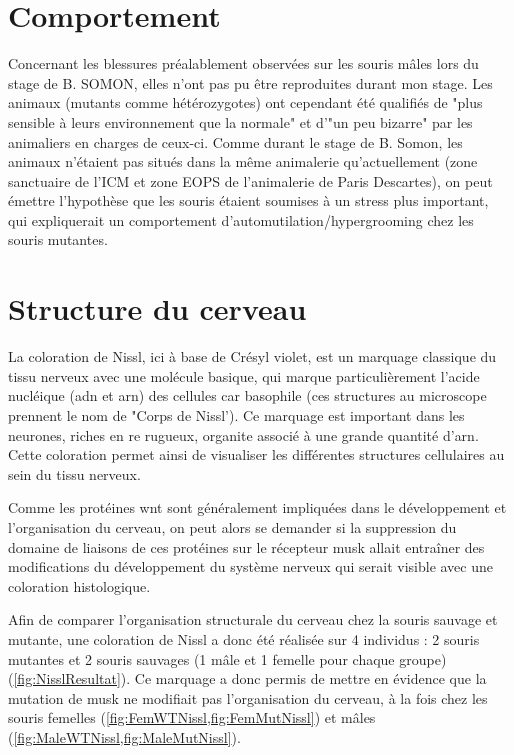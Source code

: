 \section{Comportement}
\label{sec:Comportement}
	Concernant les blessures préalablement observées sur les souris \mcrd mâles lors du stage de B. SOMON, elles n'ont pas pu être reproduites durant mon stage. Les animaux (mutants comme hétérozygotes) ont cependant été qualifiés de "plus sensible à leurs environnement que la normale" et d'"un peu bizarre" par les animaliers en charges de ceux-ci. Comme durant le stage de B. Somon, les animaux n'étaient pas situés dans la même animalerie qu'actuellement (zone sanctuaire de l'ICM et zone EOPS de l'animalerie de Paris Descartes), on peut émettre l'hypothèse que les souris étaient soumises à un stress plus important, qui expliquerait un comportement d'automutilation/hypergrooming chez les souris mutantes. 

\section{Structure du cerveau}
\label{sec:NisslResultat}
	La coloration de Nissl, ici à base de Crésyl violet, est un marquage classique du tissu nerveux avec une molécule basique, qui marque particulièrement l'acide nucléique (\acrshort{adn} et \acrshort{arn}) des cellules car basophile (ces structures au microscope prennent le nom de "Corps de Nissl'). Ce marquage est important dans les neurones, riches en \gls{re} rugueux, organite associé à une grande quantité d'\acrshort{arn}. Cette coloration permet ainsi de visualiser les différentes structures cellulaires au sein du tissu nerveux.

	Comme les protéines \gls{wnt} sont généralement impliquées dans le développement et l'organisation du cerveau, on peut alors se demander si la suppression du domaine de liaisons de ces protéines sur le récepteur \gls{musk} allait entraîner des modifications du développement du système nerveux qui serait visible avec une coloration histologique.

	Afin de comparer l'organisation structurale du cerveau chez la souris sauvage et mutante, une coloration de Nissl a donc été réalisée sur 4 individus : 2 souris mutantes et 2 souris sauvages (1 mâle et 1 femelle pour chaque groupe) (\cref{fig:NisslResultat}). Ce marquage a donc permis de mettre en évidence que la mutation de \gls{musk} ne modifiait pas l'organisation du cerveau, à la fois chez les souris femelles (\cref{fig:FemWTNissl,fig:FemMutNissl}) et mâles (\cref{fig:MaleWTNissl,fig:MaleMutNissl}). 

